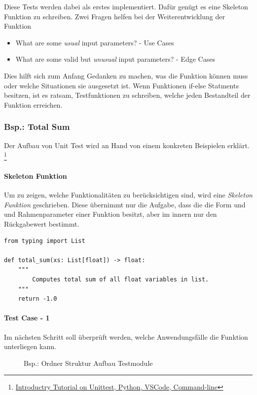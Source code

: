 Diese Tests werden dabei als erstes implementiert. Dafür genügt es eine Skeleton Funktion zu schreiben. Zwei Fragen helfen bei der Weiterentwicklung der Funktion
\begin{itemize}
	\item What are some \textit{usual} input parameters? - Use Cases
	\item What are some valid but \textit{unusual} input parameters? - Edge Cases
\end{itemize}
Dies hilft sich zum Anfang Gedanken zu machen, was die Funktion können muss oder welche Situationen sie ausgesetzt ist. Wenn Funktionen if-else Statments besitzen, ist es ratsam, Testfunktionen zu schreiben, welche jeden Bestandteil der Funktion erreichen.


\subsubsection{Bsp.: Total Sum}
Der Aufbau von Unit Test wird an Hand von einem konkreten Beispielen erklärt. \footnote{
	\href{https://youtu.be/UMgxJvozR5A}{Introductry Tutorial on Unittest, Python, VSCode, Command-line}
}

\paragraph{Skeleton Funktion}
Um zu zeigen, welche Funktionalitäten zu berücksichtigen sind, wird eine \textit{Skeleton Funktion} geschrieben. Diese übernimmt nur die Aufgabe, dass die die Form und und Rahmenparameter einer Funktion besitzt, aber im innern nur den Rückgabewert bestimmt.

\begin{lstlisting}[style=python, caption={Skelton-Function - Version 1; Skeleton.py}, captionpos=b]
from typing import List

def total_sum(xs: List[float]) -> float:
    """
        Computes total sum of all float variables in list.
    """
    return -1.0
\end{lstlisting}

\paragraph{Test Case - 1}
Im nächsten Schritt soll überprüft werden, welche Anwendungsfälle die Funktion unterliegen kann. 

\begin{figure}[h]
	\centering
	\caption{Bsp.: Ordner Struktur Aufbau Testmodule}
\end{figure}

